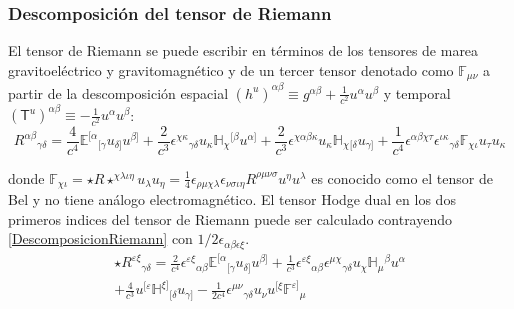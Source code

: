 \documentclass[aspectratio=169,10pt,usenames,dvipsnames,spanish]{beamer}
\begin{document}

\begin{frame}
\frametitle{Descomposición del tensor de Riemann}
    El tensor de Riemann se puede escribir en términos de los tensores de marea gravitoeléctrico y gravitomagnético y de un tercer tensor denotado como $\mathbb{F_{\mu\nu}}$ a partir de la descomposición espacial  $(h^u)^{\alpha\beta} \equiv g^{\alpha\beta}+\frac{1}{c^2}u^{\alpha}u^{\beta}$ y temporal $(\mathsf{T}^u)^{\alpha\beta}\equiv-\frac{1}{c^2}u^{\alpha}u^{\beta}$:
\begin{equation}\label{DescomposicionRiemann}
    R^{\alpha\beta}{}_{\gamma\delta}=\frac{4}{c^4}\mathbb{E}^{[\alpha}{}_{[\gamma}u_{\delta]}u^{\beta]}+\frac{2}{c^3}\epsilon^{\chi\kappa}{}_{\gamma\delta}u_\kappa\mathbb{H}_{\chi}{}^{[\beta}u^{\alpha]}+\frac{2}{c^3}\epsilon^{\chi\alpha\beta\kappa}u_\kappa\mathbb{H}_{\chi}{}_{[\delta}u_
    {\gamma]}+\frac{1}{c^4}\epsilon^{\alpha\beta\chi\tau}\epsilon^{\iota\kappa}{}_{\gamma\delta}\mathbb{F}_{\chi\iota}u_{\tau}u_{\kappa}
\end{equation}

donde $\mathbb{F}_{\chi\iota}=\star R\star^{\chi\lambda\iota\eta}u_{\lambda}u_{\eta}=\frac{1}{4}\epsilon_{\rho\mu\chi\lambda}\epsilon_{\nu\sigma\iota\eta}R^{\rho\mu\nu\sigma}u^{\eta}u^{\lambda}$ es conocido como el tensor de Bel \parencite{Costa2014, Gmez-Lobo2007} y no tiene análogo electromagnético. El tensor Hodge dual en los dos primeros indices del tensor de Riemann puede ser calculado contrayendo \ref{DescomposicionRiemann} con $1/2\epsilon_{\alpha\beta\epsilon\xi}$.
\begin{multline}\label{HodgeRiemannDescomposicion}
    \star R^{\varepsilon\xi}{}_{\gamma\delta}=\frac{2}{c^4}\epsilon^{\varepsilon\xi}{}_{\alpha\beta}\mathbb{E}^{[\alpha}{}_{[\gamma}u_{\delta]}u^{\beta]}
    +\frac{1}{c^3}\epsilon^{\varepsilon\xi}{}_{\alpha\beta}\epsilon^{\mu\chi}{}_{\gamma\delta}u_{\chi}\mathbb{H}_{\mu}{}^{\beta}u^{\alpha}\\+\frac{4}{c^3}u^{[\varepsilon}\mathbb{H}^{\xi]}{}_{[\delta}u_{\gamma]}
    -\frac{1}{2c^4}\epsilon^{\mu\nu}{}_{\gamma\delta}u_{\nu}u^{[\xi}\mathbb{F}^{\varepsilon]}{}_{\mu}
\end{multline}
\end{frame}


\end{document}
